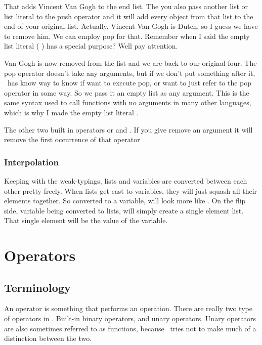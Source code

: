 \begin{SSCodeBox}
\scitea{ }
\scitea{;}
\end{SSCodeBox}

That adds Vincent Van Gogh to the end list.  The you also pass another list or list literal to the push operator and it will add every object from that list to the end of your original list.  Actually, Vincent Van Gogh is Dutch, so I guess we have to remove him.  We can employ pop for that.  Remember when I said the empty list literal ( \SSCode{()} ) has a special purpose?  Well pay attention.

\begin{SSCodeBox}
\scitea{();}
\end{SSCodeBox}

Van Gogh is now removed from the list and we are back to our original four.  The pop operator doesn't take any arguments, but if we don't put something after it, \SSquared\ has know way to know if want to execute pop, or want to just refer to the pop operator in some way.  So we pass it an empty list as any argument.  This is the same syntax used to call functions with no arguments in many other languages, which is why I made the empty list literal \SSCode{()}.

The other two built in operators or  and .  If you give remove an argument it will remove the first occurrence of that operator

\subsection{Interpolation}

Keeping with the weak-typings, lists and variables are converted between each other pretty freely.  When lists get cast to variables, they will just squash all their elements together.  So  converted to a variable, will look more like .  On the flip side, variable being converted to lists, will simply create a single element list.  That single element will be the value of the variable.

%
%
\chapter{Operators}

\section{Terminology}
An operator is something that performs an operation.  There are really two type of operators in \SSquared{}.  Built-in binary operators, and unary operators.  Unary operators are also sometimes referred to as functions, because \SSquared\ tries not to make much of a distinction between the two.

